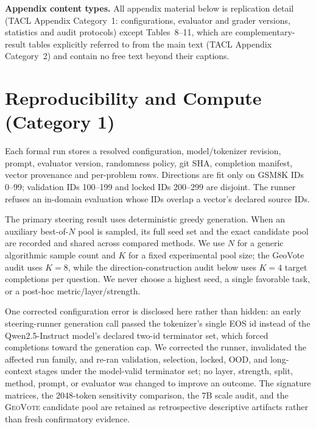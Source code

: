 \noindent\textbf{Appendix content types.} All appendix material below is
replication detail (TACL Appendix Category~1: configurations, evaluator and
grader versions, statistics and audit protocols) except Tables~8--11, which
are complementary-result tables explicitly referred to from the main text
(TACL Appendix Category~2) and contain no free text beyond their captions.

\section{Reproducibility and Compute (Category 1)}
\label{app:repro}

Each formal run stores a
resolved configuration, model/tokenizer revision, prompt, evaluator version,
randomness policy, git SHA, completion manifest, vector provenance and per-problem
rows.  Directions are fit only on GSM8K IDs 0--99; validation IDs 100--199 and
locked IDs 200--299 are disjoint.  The runner refuses an in-domain evaluation
whose IDs overlap a vector's declared source IDs.

The primary steering result uses deterministic greedy generation. When an
auxiliary best-of-$N$ pool is sampled, its full seed set and the exact candidate
pool are recorded and shared across compared methods. We use $N$ for a generic
algorithmic sample count and $K$ for a fixed experimental pool size; the GeoVote
audit uses $K{=}8$, while the direction-construction audit below uses $K{=}4$
target completions per question. We never choose a highest seed, a single
favorable task, or a post-hoc metric/layer/strength.

One corrected configuration error is disclosed here rather than hidden: an
early steering-runner generation call passed the tokenizer's single EOS id
instead of the Qwen2.5-Instruct model's declared two-id terminator set, which
forced completions toward the generation cap. We corrected the runner,
invalidated the affected run family, and re-ran validation, selection, locked,
OOD, and long-context stages under the model-valid terminator set; no layer,
strength, split, method, prompt, or evaluator was changed to improve an
outcome. The signature matrices, the 2048-token sensitivity comparison, the
7B scale audit, and the \textsc{GeoVote} candidate pool are retained as
retrospective descriptive artifacts rather than fresh confirmatory evidence.

